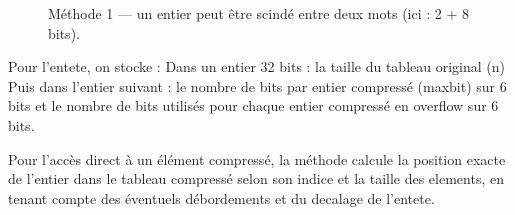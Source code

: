 \documentclass{rapportClass} %
\begin{document}
\begin{figure}[h!]

    \caption{Méthode 1 — un entier peut être scindé entre deux mots (ici : 2 + 8 bits).}
\end{figure}
Pour l'entete, on stocke :
Dans un entier 32 bits : la taille du tableau original (n)
Puis dans l'entier suivant : le nombre de bits par entier compressé (maxbit) sur 6 bits et le nombre de bits utilisés pour chaque entier compressé en overflow sur 6 bits.

Pour l'accès direct à un élément compressé, la méthode calcule la position exacte de l'entier dans le tableau compressé selon son indice et la taille des elements, en tenant compte des éventuels débordements et du decalage de l'entete.
\end{document}
